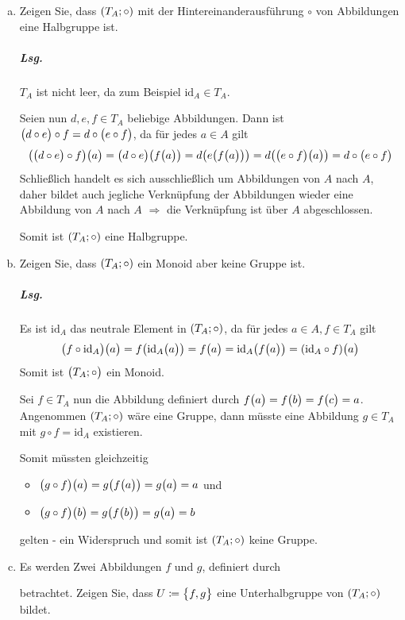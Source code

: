\documentclass{scrreprt}
\begin{document}
\begin{enumerate}[(a)]
\item Zeigen Sie, dass $\qty(T_A; \circ)$ mit der Hintereinanderausführung
  $\circ$ von Abbildungen eine Halbgruppe ist.

  \subparagraph{Lsg.} $T_A$ ist nicht leer, da zum Beispiel
  $\text{id}_A \in T_A$.

  Seien nun $d, e, f \in T_A$ beliebige Abbildungen.
  Dann ist $\qty\big(d \circ e) \circ f = d \circ \qty\big(e \circ f)$, da für
  jedes $a \in A$ gilt
  \[
    \qty(\qty\big(d \circ e) \circ f)\qty\big(a)
    = \qty\big(d \circ e)\qty(f\qty\big(a))
    = d\qty(e\qty(f\qty\big(a)))
    = d\qty(\qty\big(e \circ f)\qty\big(a))
    = d \circ \qty\big(e \circ f)
  \]
  Schließlich handelt es sich ausschließlich um Abbildungen von $A$ nach $A$,
  daher bildet auch jegliche Verknüpfung der Abbildungen wieder eine Abbildung
  von $A$ nach $A$
  $\Rightarrow$ die Verknüpfung ist über $A$ abgeschlossen.

  Somit ist $\qty(T_A; \circ)$ eine Halbgruppe.

\item Zeigen Sie, dass $\qty(T_A; \circ)$ ein Monoid aber keine Gruppe ist.

  \subparagraph{Lsg.} Es ist $\text{id}_A$ das neutrale Element in
  $\qty(T_A; \circ)$, da für jedes $a \in A, f \in T_A$ gilt
  \[
    \qty\big(f \circ \text{id}_A)\qty\big(a) = f\qty(\text{id}_A\qty\big(a))
    = f\qty\big(a) =
    \text{id}_A\qty(f\qty\big(a)) = \qty(\text{id}_A \circ f)\qty\big(a)
  \]
  Somit ist $\qty\big(T_A; \circ)$ ein Monoid.

  Sei $f \in T_A$ nun die Abbildung definiert durch
  $f\qty\big(a) = f\qty\big(b) = f\qty\big(c) = a$.
  Angenommen $\qty(T_A; \circ)$ wäre eine Gruppe, dann müsste eine
  Abbildung $g \in T_A$ mit $g \circ f = \text{id}_A$ existieren.

  Somit müssten gleichzeitig
  \begin{itemize}
  \item $\qty\big(g \circ f)\qty\big(a) = g\qty(f\qty\big(a)) = g\qty\big(a) = a$ und
  \item $\qty\big(g \circ f)\qty\big(b) = g\qty(f\qty\big(b)) = g\qty\big(a) = b$
  \end{itemize}
  gelten - ein Widerspruch und somit ist $\qty(T_A; \circ)$ keine Gruppe.
\item Es werden Zwei Abbildungen $f$ und $g$, definiert durch
  betrachtet.
  Zeigen Sie, dass $U \coloneqq \qty\big{f, g}$ eine Unterhalbgruppe von
  $\qty(T_A; \circ)$ bildet.


\end{enumerate}
\end{document}
